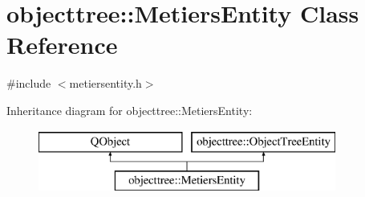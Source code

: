 \hypertarget{classobjecttree_1_1_metiers_entity}{}\section{objecttree\+::Metiers\+Entity Class Reference}
\label{classobjecttree_1_1_metiers_entity}


{\ttfamily \#include $<$metiersentity.\+h$>$}

Inheritance diagram for objecttree\+::Metiers\+Entity\+:\begin{figure}[H]
\begin{center}
\leavevmode
\includegraphics[height=2.000000cm]{dc/da2/classobjecttree_1_1_metiers_entity}
\end{center}
\end{figure}
